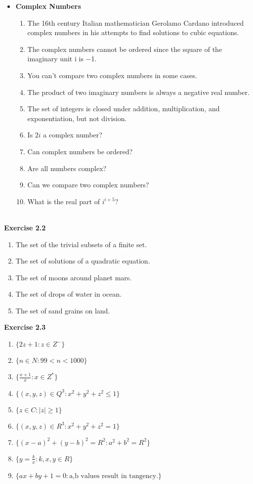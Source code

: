\documentclass{article}
\begin{document}
\begin{itemize}
	\item \textbf{Complex Numbers}
	\begin{enumerate}
		\item 
		The 16th century Italian mathematician Gerolamo Cardano introduced complex numbers in his attempts to find solutions to cubic equations.
		\item 
		The complex numbers cannot be ordered since the square of the imaginary unit i is −1.
		\item
		You can't compare two complex numbers in some cases.
		\item 
		The product of two imaginary numbers is always a negative real number.
		\item 
		The set of integers is closed under addition, multiplication, and exponentiation, but not division.
		\item 
		Is $2i$ a complex number?
		\item 
		Can complex numbers be ordered?
		\item 
		Are all numbers complex?
		\item 
		Can we compare two complex numbers?
		\item 
		What is the real part of $i^{i+5}?$
	\end{enumerate}
\end{itemize}
\text{}\\
\textbf{\large\color{blue} Exercise 2.2}
	\begin{enumerate}
		\item 
		The set of the trivial subsets of a finite set.
		\item 
		The set of solutions of a quadratic equation.
		\item 
		The set of moons around planet mars.
		\item
		The set of drops of water in ocean.
		\item 
		The set of sand grains on land.
	\end{enumerate}
\textbf{\large\color{blue} Exercise 2.3}
	\begin{enumerate}
		\item 
		$\{2z+1 : z \in Z^{-}\}$
		\item 
		$\{n \in N : 99<n<1000\}$
		\item 
		$\{\frac{x+1}{x} : x \in Z^{*} \}$
		\item 
		$\{(x,y,z) \in Q^{3} : x^{2}+y^{2}+z^{2} \leq 1 \}$
		\item 
		$\{z \in C : |z| \geq 1\}$
		\item 
		$\{(x,y,z) \in R^{3} : x^{2}+y^{2}+z^{2}=1 \}$
		\item 
		$\{(x-a)^{2}+(y-b)^{2}=R^{2} : a^{2}+b^{2}=R^{2} \}$
		\item 
		$\{y=\frac{k}{x} : k,x,y \in R \}$
		\item 
		$\{ ax+by+1=0 : \text{a,b values result in tangency.} \}$
	\end{enumerate}
\end{document}
